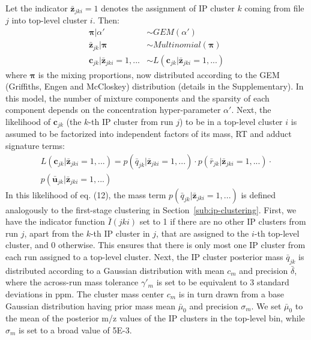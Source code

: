 Let the indicator $\boldsymbol{\bar{z}}_{jki}=1$ denotes the assignment of IP cluster $k$ coming from file $j$ into top-level cluster $i$. Then:
\begin{align}
\boldsymbol{\pi}\vert\alpha' &\sim GEM(\alpha') \\
\boldsymbol{\bar{z}}_{jk}\vert\boldsymbol{\pi} &\sim Multinomial(\boldsymbol{\pi}) \\
\boldsymbol{c}_{jk}\vert\boldsymbol{\bar{z}}_{jki}=1,... &\sim L(\boldsymbol{c}_{jk}\vert\boldsymbol{\bar{z}}_{jki}=1,...)
\end{align}
where $\boldsymbol{\pi}$ is the mixing proportions, now distributed according to the GEM (Griffiths, Engen and McCloskey) distribution (details in the Supplementary). In this model, the number of mixture components and the sparsity of each component depends on the concentration hyper-parameter $\alpha'$. Next, the likelihood of $\boldsymbol{c}_{jk}$ (the $k$-th IP cluster from run $j$) to be in a top-level cluster $i$ is assumed to be factorized into independent factors of its mass, RT and adduct signature terms:
\begin{equation}
\begin{split}
L(\boldsymbol{c}_{jk}\vert\boldsymbol{\bar{z}}_{jki}=1,...) = p({\bar{q}}_{jk}\vert\boldsymbol{\bar{z}}_{jki}=1,...) \cdot p({\bar{r}}_{jk}\vert\boldsymbol{\bar{z}}_{jki}=1,...) \cdot \\
p({\boldsymbol{\bar{u}}}_{jk}\vert\boldsymbol{\bar{z}}_{jki}=1,...)
\end{split}
\end{equation}
In this likelihood of eq. (12), the mass term $p({\bar{q}}_{jk}\vert\boldsymbol{\bar{z}}_{jki}=1,...)$ is defined analogously to the first-stage clustering in Section~\ref{sub:ip-clustering}. First, we have the indicator function $\bar{I}(jki)$ set to 1 if there are no other IP clusters from run $j$, apart from the $k$-th IP cluster in $j$, that are assigned to the $i$-th top-level cluster, and 0 otherwise. This ensures that there is only most one IP cluster from each run assigned to a top-level cluster. Next, the IP cluster posterior mass ${\bar{q}}_{jk}$ is distributed according to a Gaussian distribution with mean $c_m$ and precision $\bar{\delta}$, where the across-run mass tolerance $\gamma'_m$ is set to be equivalent to 3 standard deviations in ppm. The cluster mass center $c_m$ is in turn drawn from a base Gaussian distribution having prior mass mean $\bar{\mu}_0$ and precision $\sigma_m$. We set $\bar{\mu}_0$ to the mean of the posterior m/z values of the IP clusters in the top-level bin, while $\sigma_m$ is set to a broad value of 5E-3. 

